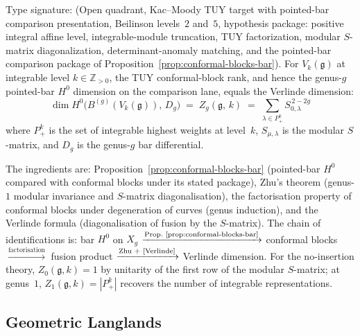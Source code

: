 \begin{theorem}
\label{thm:bar-verlinde-recovery}
Type signature: \textup{(}Open quadrant, Kac--Moody TUY target with
pointed-bar comparison presentation, Beilinson levels~$2$ and~$5$,
hypothesis package: positive integral affine level, integrable-module
truncation, TUY factorization, modular \(S\)-matrix diagonalization,
determinant-anomaly matching, and the pointed-bar comparison package of
Proposition~\textup{\ref{prop:conformal-blocks-bar}}\textup{)}.
For $V_k(\mathfrak{g})$ at integrable level $k \in \mathbb{Z}_{>0}$,
the TUY conformal-block rank, and hence the genus-$g$ pointed-bar
\(H^0\) dimension on the comparison lane, equals the Verlinde
dimension:
\begin{equation}\label{eq:bar-verlinde-recovery}
\dim H^0\bigl(B^{(g)}(V_k(\mathfrak{g})),\, D_g\bigr)
\;=\;
Z_g(\mathfrak{g},\, k)
\;=\;
\sum_{\lambda \in P_+^k}
S_{0,\lambda}^{\,2-2g}
\end{equation}
where $P_+^k$ is the set of integrable highest weights at level~$k$,
$S_{\mu,\lambda}$ is the modular $S$-matrix, and
$D_g$ is the genus-$g$ bar differential.
\end{theorem}

\begin{remark}[Attribution]
The ingredients are: Proposition~\ref{prop:conformal-blocks-bar}
(pointed-bar \(H^0\) compared with conformal blocks under its stated
package), Zhu's theorem
\cite{Zhu96} (genus-$1$ modular invariance and $S$-matrix
diagonalisation), the factorisation property of conformal blocks
under degeneration of curves (genus induction), and the Verlinde
formula \cite{Verlinde} (diagonalisation of fusion by the
$S$-matrix). The chain of identifications is:
bar $H^0$ on $X_g$ $\xrightarrow{\text{Prop.~\ref{prop:conformal-blocks-bar}}}$
conformal blocks $\xrightarrow{\text{factorisation}}$
fusion product $\xrightarrow{\text{Zhu + \cite{Verlinde}}}$
Verlinde dimension.
For the no-insertion theory, $Z_0(\mathfrak g,k)=1$ by unitarity of
the first row of the modular \(S\)-matrix; at genus~$1$,
$Z_1(\mathfrak{g}, k) = |P_+^k|$ recovers the number of
integrable representations.
\end{remark}

\subsection{Geometric Langlands}

